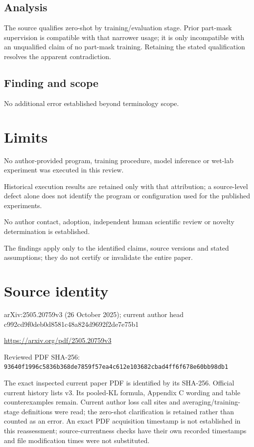 \documentclass[11pt]{article}
\begin{document}
\subsection*{Analysis}

The source qualifies zero-shot by training/evaluation stage. Prior part-mask supervision is compatible with that narrower usage; it is only incompatible with an unqualified claim of no part-mask training. Retaining the stated qualification resolves the apparent contradiction.

\subsection*{Finding and scope}

No additional error established beyond terminology scope.

\section*{Limits}

No author-provided program, training procedure, model inference or wet-lab experiment was executed in this review.\par

Historical execution results are retained only with that attribution; a source-level defect alone does not identify the program or configuration used for the published experiments.\par

No author contact, adoption, independent human scientific review or novelty determination is established.\par

The findings apply only to the identified claims, source versions and stated assumptions; they do not certify or invalidate the entire paper.\par

\section*{Source identity}

arXiv:2505.20759v3 (26 October 2025); current author head c992cd9f0deb0d8581c48a824d9692f2de7e75b1

\url{https://arxiv.org/pdf/2505.20759v3}

Reviewed PDF SHA-256: \nolinkurl{93640f1996c5836b368de7859f57ea4c612e103682cbad4ff6f678e60bb98db1}

The exact inspected current paper PDF is identified by its SHA-256. Official current history lists v3. Its pooled-KL formula, Appendix C wording and table counterexamples remain. Current author loss call sites and averaging/training-stage definitions were read; the zero-shot clarification is retained rather than counted as an error. An exact PDF acquisition timestamp is not established in this reassessment; source-currentness checks have their own recorded timestamps and file modification times were not substituted.
\end{document}

